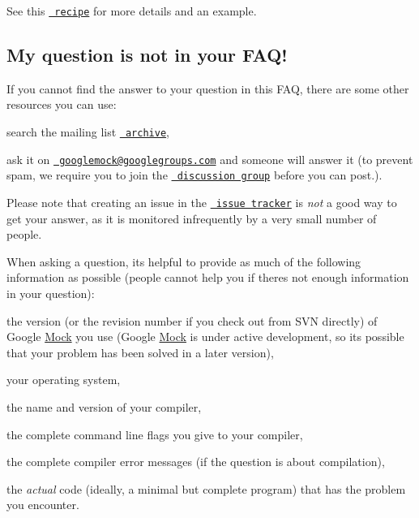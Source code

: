 See this \href{CookBook.md\#mocking_side_effects}{\texttt{ recipe}} for more details and an example.

\subsection*{My question is not in your F\+A\+Q!}

If you cannot find the answer to your question in this F\+AQ, there are some other resources you can use\+:


\begin{DoxyEnumerate}
\item search the mailing list \href{http://groups.google.com/group/googlemock/topics}{\texttt{ archive}},
\end{DoxyEnumerate}
\begin{DoxyEnumerate}
\item ask it on \href{mailto:googlemock@googlegroups.com}{\texttt{ googlemock@googlegroups.\+com}} and someone will answer it (to prevent spam, we require you to join the \href{http://groups.google.com/group/googlemock}{\texttt{ discussion group}} before you can post.).
\end{DoxyEnumerate}

Please note that creating an issue in the \href{https://github.com/google/googletest/issues}{\texttt{ issue tracker}} is {\itshape not} a good way to get your answer, as it is monitored infrequently by a very small number of people.

When asking a question, it\textquotesingle{}s helpful to provide as much of the following information as possible (people cannot help you if there\textquotesingle{}s not enough information in your question)\+:


\begin{DoxyItemize}
\item the version (or the revision number if you check out from S\+VN directly) of Google \mbox{\hyperlink{classMock}{Mock}} you use (Google \mbox{\hyperlink{classMock}{Mock}} is under active development, so it\textquotesingle{}s possible that your problem has been solved in a later version),
\item your operating system,
\item the name and version of your compiler,
\item the complete command line flags you give to your compiler,
\item the complete compiler error messages (if the question is about compilation),
\item the {\itshape actual} code (ideally, a minimal but complete program) that has the problem you encounter. 
\end{DoxyItemize}